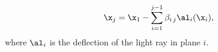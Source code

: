 \begin{equation}
\label{eqn:mp_full}
\x_j=\x_1 - \sum\limits_{i=1}^{j-1} \beta_{i\,j} \al_i(\x_i),  
\end{equation}
where $\al_i$ is the deflection of the light ray in plane $i$.
  
  